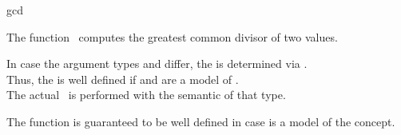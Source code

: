 \begin{ccRefFunction}{gcd}

\ccDefinition

The function \ccRefName\ computes the greatest common divisor of two values.

In case the argument types  and  differ, 
the  is determined via .\\
Thus, the  is well defined if  and  
are a model of . \\
The actual \ccRefName\ is performed with the semantic of that type.

The function is guaranteed to be well defined in case 
is a model of the  concept.



\ccSeeAlso

\\
\\

\end{ccRefFunction}
